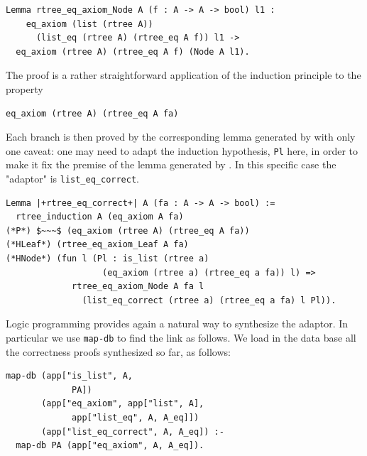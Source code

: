 \documentclass[sigplan,10pt,review]{acmart}\settopmatter{printfolios=true,printccs=false,printacmref=false}
\newcommand{\derive}[1]{\keys{#1}}
\begin{document}
\begin{minipage}{\textwidth}\begin{lstlisting}
Lemma rtree_eq_axiom_Node A (f : A -> A -> bool) l1 :
    eq_axiom (list (rtree A))
      (list_eq (rtree A) (rtree_eq A f)) l1 ->
  eq_axiom (rtree A) (rtree_eq A f) (Node A l1).
\end{lstlisting}\end{minipage}
       
\noindent
The proof is a rather straightforward application
of the induction principle to the property

\begin{minipage}{\textwidth}\begin{lstlisting}
eq_axiom (rtree A) (rtree_eq A fa)
\end{lstlisting}\end{minipage}

\noindent
Each branch is then proved by the corresponding
lemma generated by \derive{eqK} with only one caveat:
one may need to adapt the induction hypothesis, 
\lstinline+Pl+ here, in order to make it fix the premise
of the lemma generated by \derive{eqK}. In this specific
case the "adaptor" is \lstinline+list_eq_correct+.

\begin{minipage}{\textwidth}\begin{lstlisting}
Lemma |+rtree_eq_correct+| A (fa : A -> A -> bool) :=
  rtree_induction A (eq_axiom A fa)
(*P*) $~~~$ (eq_axiom (rtree A) (rtree_eq A fa))
(*HLeaf*) (rtree_eq_axiom_Leaf A fa)
(*HNode*) (fun l (Pl : is_list (rtree a)
                   (eq_axiom (rtree a) (rtree_eq a fa)) l) =>
             rtree_eq_axiom_Node A fa l
               (list_eq_correct (rtree a) (rtree_eq a fa) l Pl)).
\end{lstlisting}\end{minipage}

Logic programming provides again a natural way to synthesize
the adaptor. In particular we use \lstinline+map-db+ 
to find the link as follows. We load in the data base
all the correctness proofs synthesized so far, as follows:

\begin{minipage}{\textwidth}\begin{lstlisting}[]
map-db (app["is_list", A,
             PA])
       (app["eq_axiom", app["list", A],
             app["list_eq", A, A_eq]])
       (app["list_eq_correct", A, A_eq]) :-
  map-db PA (app["eq_axiom", A, A_eq]).
\end{lstlisting}\end{minipage}
\end{document}
